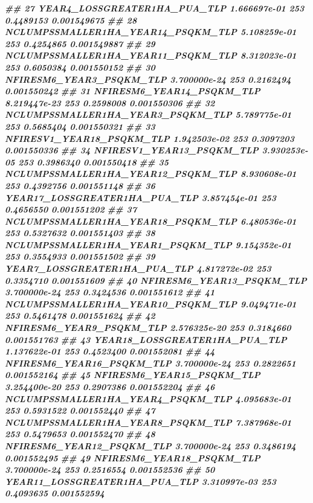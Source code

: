 \documentclass[10pt,landscape,a3paper]{article}
\newenvironment{Shaded}{\begin{snugshade}}{\end{snugshade}}
\newcommand{\DocumentationTok}[1]{\textcolor[rgb]{0.56,0.35,0.01}{\textbf{\textit{#1}}}}
\begin{document}
\begin{Shaded}
\begin{Highlighting}[]
\DocumentationTok{\#\# 27       YEAR4\_LOSSGREATER1HA\_PUA\_TLP 1.666697e{-}01    253 0.4489153 0.001549675}
\DocumentationTok{\#\# 28 NCLUMPSSMALLER1HA\_YEAR14\_PSQKM\_TLP 5.108259e{-}01    253 0.4254865 0.001549887}
\DocumentationTok{\#\# 29 NCLUMPSSMALLER1HA\_YEAR11\_PSQKM\_TLP 8.312023e{-}01    253 0.6050384 0.001550152}
\DocumentationTok{\#\# 30           NFIRESM6\_YEAR3\_PSQKM\_TLP 3.700000e{-}24    253 0.2162494 0.001550242}
\DocumentationTok{\#\# 31          NFIRESM6\_YEAR14\_PSQKM\_TLP 8.219447e{-}23    253 0.2598008 0.001550306}
\DocumentationTok{\#\# 32  NCLUMPSSMALLER1HA\_YEAR3\_PSQKM\_TLP 5.789775e{-}01    253 0.5685404 0.001550321}
\DocumentationTok{\#\# 33          NFIRESV1\_YEAR18\_PSQKM\_TLP 1.942503e{-}02    253 0.3097203 0.001550336}
\DocumentationTok{\#\# 34          NFIRESV1\_YEAR13\_PSQKM\_TLP 3.930253e{-}05    253 0.3986340 0.001550418}
\DocumentationTok{\#\# 35 NCLUMPSSMALLER1HA\_YEAR12\_PSQKM\_TLP 8.930608e{-}01    253 0.4392756 0.001551148}
\DocumentationTok{\#\# 36      YEAR17\_LOSSGREATER1HA\_PUA\_TLP 3.857454e{-}01    253 0.4656550 0.001551202}
\DocumentationTok{\#\# 37 NCLUMPSSMALLER1HA\_YEAR18\_PSQKM\_TLP 6.480536e{-}01    253 0.5327632 0.001551403}
\DocumentationTok{\#\# 38  NCLUMPSSMALLER1HA\_YEAR1\_PSQKM\_TLP 9.154352e{-}01    253 0.3554933 0.001551502}
\DocumentationTok{\#\# 39       YEAR7\_LOSSGREATER1HA\_PUA\_TLP 4.817272e{-}02    253 0.3354710 0.001551609}
\DocumentationTok{\#\# 40          NFIRESM6\_YEAR13\_PSQKM\_TLP 3.700000e{-}24    253 0.3424536 0.001551612}
\DocumentationTok{\#\# 41 NCLUMPSSMALLER1HA\_YEAR10\_PSQKM\_TLP 9.049471e{-}01    253 0.5461478 0.001551624}
\DocumentationTok{\#\# 42           NFIRESM6\_YEAR9\_PSQKM\_TLP 2.576325e{-}20    253 0.3184660 0.001551763}
\DocumentationTok{\#\# 43      YEAR18\_LOSSGREATER1HA\_PUA\_TLP 1.137622e{-}01    253 0.4523400 0.001552081}
\DocumentationTok{\#\# 44          NFIRESM6\_YEAR16\_PSQKM\_TLP 3.700000e{-}24    253 0.2822651 0.001552164}
\DocumentationTok{\#\# 45          NFIRESM6\_YEAR15\_PSQKM\_TLP 3.254400e{-}20    253 0.2907386 0.001552204}
\DocumentationTok{\#\# 46  NCLUMPSSMALLER1HA\_YEAR4\_PSQKM\_TLP 4.095683e{-}01    253 0.5931522 0.001552440}
\DocumentationTok{\#\# 47  NCLUMPSSMALLER1HA\_YEAR8\_PSQKM\_TLP 7.387968e{-}01    253 0.5479653 0.001552470}
\DocumentationTok{\#\# 48          NFIRESM6\_YEAR12\_PSQKM\_TLP 3.700000e{-}24    253 0.3486194 0.001552495}
\DocumentationTok{\#\# 49          NFIRESM6\_YEAR18\_PSQKM\_TLP 3.700000e{-}24    253 0.2516554 0.001552536}
\DocumentationTok{\#\# 50      YEAR11\_LOSSGREATER1HA\_PUA\_TLP 3.310997e{-}03    253 0.4093635 0.001552594}

\end{Highlighting}
\end{Shaded}
\end{document}
